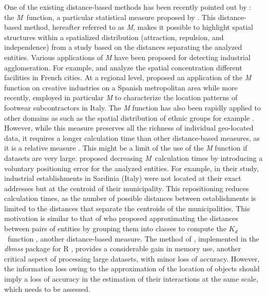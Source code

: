 \documentclass[fleqn,10pt]{latex/stylish_article} %
\begin{document}
One of the existing distance-based methods has been recently pointed out by \citet{Tidu2023}: the \emph{M}~function, a particular statistical measure proposed by \citet{Marcon2010}.
This distance-based method, hereafter referred to as \emph{M}, makes it possible to highlight spatial structures within a spatialized distribution (attraction, repulsion, and independence) from a study based on the distances separating the analyzed entities.
Various applications of \emph{M} have been proposed for detecting industrial agglomeration.
For example, \citet{Jensen2011} and \citet{Floch2018} analyze the spatial concentration different facilities in French cities.
At a regional level, \citet{Coll-Martinez2019} proposed an application of the \emph{M} function on creative industries on a Spanish metropolitan area while more recently, \citet{Canello2025} employed in particular \emph{M} to characterize the location patterns of footwear subcontractors in Italy.
The \emph{M} function has also been rapidly applied to other domains as such as the spatial distribution of ethnic groups for example \citep{Deurloo2008}.
However, while this measure preserves all the richness of individual geo-located data, it requires a longer calculation time than other distance-based measures, as it is a relative measure \citep[ reviewed the advantages and limitations of a dozen existing distance-based measures]{Marcon2017}.
This might be a limit of the use of the \emph{M} function if datasets are very large.
\citet{Tidu2023} proposed decreasing \emph{M}~calculation times by introducing a voluntary positioning error for the analyzed entities.
For example, in their study, industrial establishments in Sardinia (Italy) were not located at their exact addresses but at the centroid of their municipality.
This repositioning reduces calculation times, as the number of possible distances between establishments is limited to the distances that separate the centroids of the municipalities.
This motivation is similar to that of \citet{Scholl2013} who proposed approximating the distances between pairs of entities by grouping them into classes to compute the \(K_d\)~function \citep{Duranton2005}, another distance-based measure.
The method of \citet{Scholl2013}, implemented in the \emph{dbmss} package \citep{Marcon2014} for R \citep{R}, provides a considerable gain in memory use, another critical aspect of processing large datasets, with minor loss of accuracy.
However, the information loss owing to the approximation of the location of objects should imply a loss of accuracy in the estimation of their interactions at the same scale, which needs to be assessed.
\end{document}

